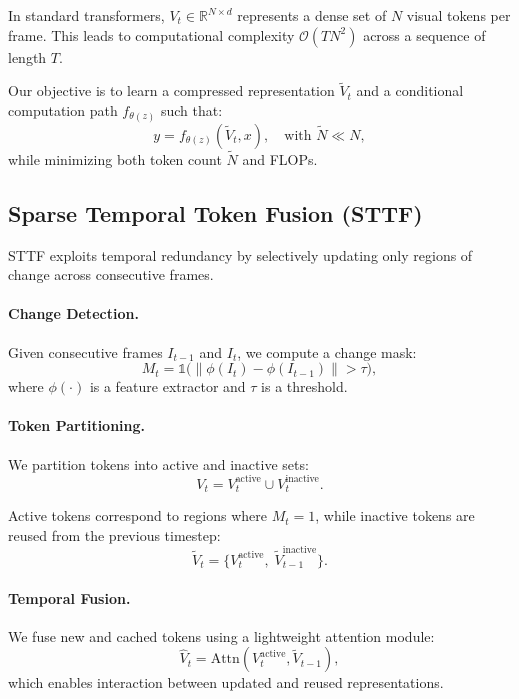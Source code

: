 \documentclass{article}
\begin{document}
In standard transformers, $V_t \in \mathbb{R}^{N \times d}$ represents a dense set of $N$ visual tokens per frame. This leads to computational complexity $\mathcal{O}(TN^2)$ across a sequence of length $T$.

Our objective is to learn a compressed representation $\tilde{V}_t$ and a conditional computation path $f_{\theta(z)}$ such that:
\begin{equation}
y = f_{\theta(z)}(\tilde{V}_t, x), \quad \text{with } \tilde{N} \ll N,
\end{equation}
while minimizing both token count $\tilde{N}$ and FLOPs.

\subsection{Sparse Temporal Token Fusion (STTF)}

STTF exploits temporal redundancy by selectively updating only regions of change across consecutive frames.

\paragraph{Change Detection.}
Given consecutive frames $I_{t-1}$ and $I_t$, we compute a change mask:
\begin{equation}
M_t = \mathbb{1}\big( \| \phi(I_t) - \phi(I_{t-1}) \| > \tau \big),
\end{equation}
where $\phi(\cdot)$ is a feature extractor and $\tau$ is a threshold.

\paragraph{Token Partitioning.}
We partition tokens into active and inactive sets:
\begin{equation}
V_t = V_t^{\text{active}} \cup V_t^{\text{inactive}}.
\end{equation}

Active tokens correspond to regions where $M_t = 1$, while inactive tokens are reused from the previous timestep:
\begin{equation}
\tilde{V}_t = \{ V_t^{\text{active}}, \; \tilde{V}_{t-1}^{\text{inactive}} \}.
\end{equation}

\paragraph{Temporal Fusion.}
We fuse new and cached tokens using a lightweight attention module:
\begin{equation}
\hat{V}_t = \text{Attn}(V_t^{\text{active}}, \tilde{V}_{t-1}),
\end{equation}
which enables interaction between updated and reused representations.
\end{document}
